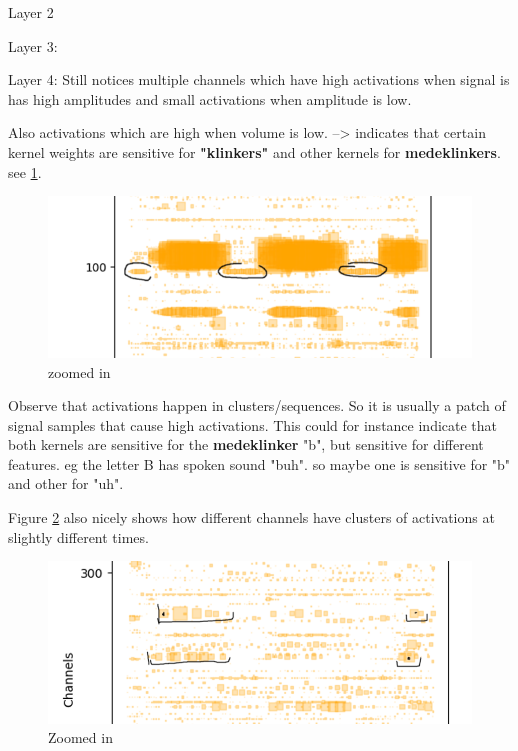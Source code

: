 \begin{appendices}
	Layer 2
	
	Layer 3:
	
	Layer 4:
	Still notices multiple channels which have high activations when signal is has high amplitudes and small activations when amplitude is low. 
	
	Also activations which are high when volume is low. --> indicates that certain kernel weights are sensitive for \textbf{"klinkers"} and other kernels for \textbf{medeklinkers}. see \ref{fig:screenshot008}.
	
	\begin{figure}[h]
		\centering
		\includegraphics[width=0.7\linewidth]{screenshot008}
		\caption{zoomed in}
		\label{fig:screenshot008}
	\end{figure}
	
	
	Observe that activations happen in clusters/sequences. So it is usually a patch of signal samples that cause high activations. This could for instance indicate that both kernels are sensitive for the \textbf{medeklinker} "b", but sensitive for different features. eg the letter B has spoken sound "buh". so maybe one is sensitive for "b" and other for "uh".
	
	Figure \ref{fig:layer4 zoomed in} also nicely shows how different channels have clusters of activations at slightly different times. 
	
	\begin{figure}[h]
		\centering
		\includegraphics[width=0.7\linewidth]{screenshot010}
		\caption{Zoomed in}
		\label{fig:layer4 zoomed in}
	\end{figure}
	
	

\end{appendices}